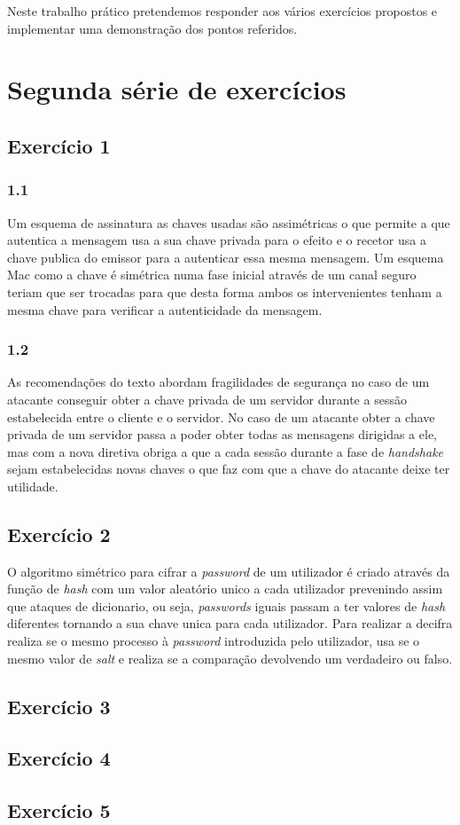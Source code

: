 \documentclass[11pt]{report}
\begin{document}
Neste trabalho prático pretendemos responder aos vários exercícios propostos e implementar uma demonstração dos pontos referidos.

\newpage

\section{Segunda série de exercícios}

\subsection{Exercício 1}
	\subsubsection*{1.1}
	Um esquema de assinatura as chaves usadas são assimétricas o que permite a que autentica a mensagem usa a sua chave privada para o efeito e o recetor usa a chave publica do emissor para a autenticar essa mesma mensagem. Um esquema Mac como a chave é simétrica numa fase inicial através de um canal seguro teriam que ser trocadas para que desta forma ambos os intervenientes tenham a mesma chave para verificar a autenticidade da mensagem.
	
	\subsubsection*{1.2}
	As recomendações do texto abordam fragilidades de segurança no caso de um atacante conseguir obter a chave privada de um servidor durante a sessão estabelecida entre o cliente e o servidor. No caso de um atacante obter a chave privada de um servidor passa a poder obter todas as mensagens dirigidas a ele, mas com a nova diretiva obriga a que a cada sessão durante a fase de \textit{handshake} sejam estabelecidas novas chaves o que faz com que a chave do atacante deixe ter utilidade.

\subsection{Exercício 2}
	O algoritmo simétrico para cifrar a \textit{password} de um utilizador é criado através da função de \textit{hash} com um valor aleatório unico a cada utilizador prevenindo assim que ataques de dicionario, ou seja, \textit{passwords} iguais passam a ter valores de \textit{hash} diferentes tornando a sua chave unica para cada utilizador. Para realizar a decifra realiza se o mesmo processo à \textit{password} introduzida pelo utilizador, usa se o mesmo valor de \textit{salt} e realiza se a comparação devolvendo um verdadeiro ou falso.

\subsection{Exercício 3}

\subsection{Exercício 4}

\subsection{Exercício 5}


\newpage
\end{document}
